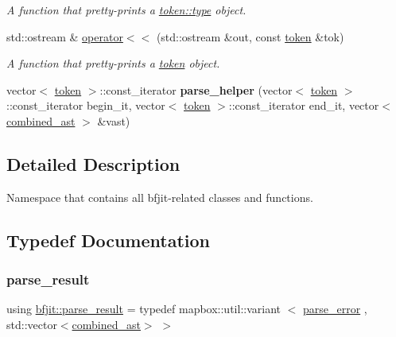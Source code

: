 \begin{DoxyCompactItemize}
\begin{DoxyCompactList}\small\item\em A function that pretty-\/prints a \hyperlink{classbfjit_1_1token_a2486a3e583fb48f3863c4eb5c32cdd96}{token\+::type} object. \end{DoxyCompactList}\item 
\hypertarget{namespacebfjit_aa0300e35ddafd8014da5627a332ad3a9}{}\label{namespacebfjit_aa0300e35ddafd8014da5627a332ad3a9} 
std\+::ostream \& \hyperlink{namespacebfjit_aa0300e35ddafd8014da5627a332ad3a9}{operator$<$$<$} (std\+::ostream \&out, const \hyperlink{classbfjit_1_1token}{token} \&tok)
\begin{DoxyCompactList}\small\item\em A function that pretty-\/prints a \hyperlink{classbfjit_1_1token}{token} object. \end{DoxyCompactList}\item 
\hypertarget{namespacebfjit_a99ffba753326db1168413603b2ad07c5}{}\label{namespacebfjit_a99ffba753326db1168413603b2ad07c5} 
vector$<$ \hyperlink{classbfjit_1_1token}{token} $>$\+::const\+\_\+iterator {\bfseries parse\+\_\+helper} (vector$<$ \hyperlink{classbfjit_1_1token}{token} $>$\+::const\+\_\+iterator begin\+\_\+it, vector$<$ \hyperlink{classbfjit_1_1token}{token} $>$\+::const\+\_\+iterator end\+\_\+it, vector$<$ \hyperlink{namespacebfjit_ad9bbdb76861e57928b1bc7695c2c0623}{combined\+\_\+ast} $>$ \&vast)
\end{DoxyCompactItemize}


\subsection{Detailed Description}
Namespace that contains all bfjit-\/related classes and functions. 

\subsection{Typedef Documentation}
\hypertarget{namespacebfjit_ac770ef0753b4d7d6bd5800262ba97f25}{}\label{namespacebfjit_ac770ef0753b4d7d6bd5800262ba97f25} 
\subsubsection{\texorpdfstring{parse\+\_\+result}{parse\_result}}
{\footnotesize\ttfamily using \hyperlink{namespacebfjit_ac770ef0753b4d7d6bd5800262ba97f25}{bfjit\+::parse\+\_\+result} = typedef mapbox\+::util\+::variant $<$ \hyperlink{classbfjit_1_1parse__error}{parse\+\_\+error} , std\+::vector$<$\hyperlink{namespacebfjit_ad9bbdb76861e57928b1bc7695c2c0623}{combined\+\_\+ast}$>$ $>$}



